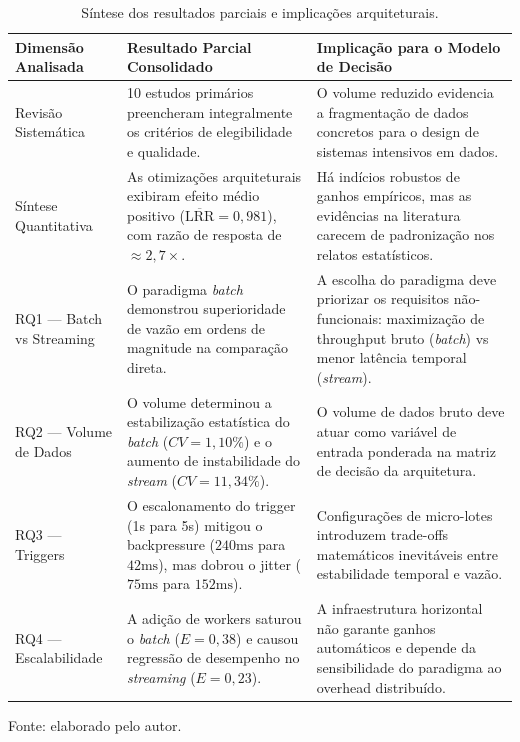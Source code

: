 \begin{table}[htbp]
\centering
\caption{Síntese dos resultados parciais e implicações arquiteturais.}
\label{tab:sintese-resultados-parciais}
\scriptsize
\setlength{\tabcolsep}{4pt}
\renewcommand{\arraystretch}{1.3}
\begin{tabularx}{\textwidth}{lXX}
\toprule
\textbf{Dimensão Analisada} & \textbf{Resultado Parcial Consolidado} & \textbf{Implicação para o Modelo de Decisão} \\
\midrule
Revisão Sistemática & 10 estudos primários preencheram integralmente os critérios de elegibilidade e qualidade. & O volume reduzido evidencia a fragmentação de dados concretos para o design de sistemas intensivos em dados. \\
\midrule
Síntese Quantitativa & As otimizações arquiteturais exibiram efeito médio positivo ($\overline{\text{LRR}} = 0{,}981$), com razão de resposta de $\approx 2{,}7\times$. & Há indícios robustos de ganhos empíricos, mas as evidências na literatura carecem de padronização nos relatos estatísticos. \\
\midrule
RQ1 --- Batch vs Streaming & O paradigma \textit{batch} demonstrou superioridade de vazão em ordens de magnitude na comparação direta. & A escolha do paradigma deve priorizar os requisitos não-funcionais: maximização de throughput bruto (\textit{batch}) vs menor latência temporal (\textit{stream}). \\
\midrule
RQ2 --- Volume de Dados & O volume determinou a estabilização estatística do \textit{batch} ($CV = 1{,}10\%$) e o aumento de instabilidade do \textit{stream} ($CV = 11{,}34\%$). & O volume de dados bruto deve atuar como variável de entrada ponderada na matriz de decisão da arquitetura. \\
\midrule
RQ3 --- Triggers & O escalonamento do trigger (1s para 5s) mitigou o backpressure ($240\text{ms}$ para $42\text{ms}$), mas dobrou o jitter ($75\text{ms}$ para $152\text{ms}$). & Configurações de micro-lotes introduzem trade-offs matemáticos inevitáveis entre estabilidade temporal e vazão. \\
\midrule
RQ4 --- Escalabilidade & A adição de workers saturou o \textit{batch} ($E = 0{,}38$) e causou regressão de desempenho no \textit{streaming} ($E = 0{,}23$). & A infraestrutura horizontal não garante ganhos automáticos e depende da sensibilidade do paradigma ao overhead distribuído. \\
\bottomrule
\end{tabularx}
\vspace{0.3em}
\begin{flushleft}
\footnotesize Fonte: elaborado pelo autor.
\end{flushleft}
\end{table}

